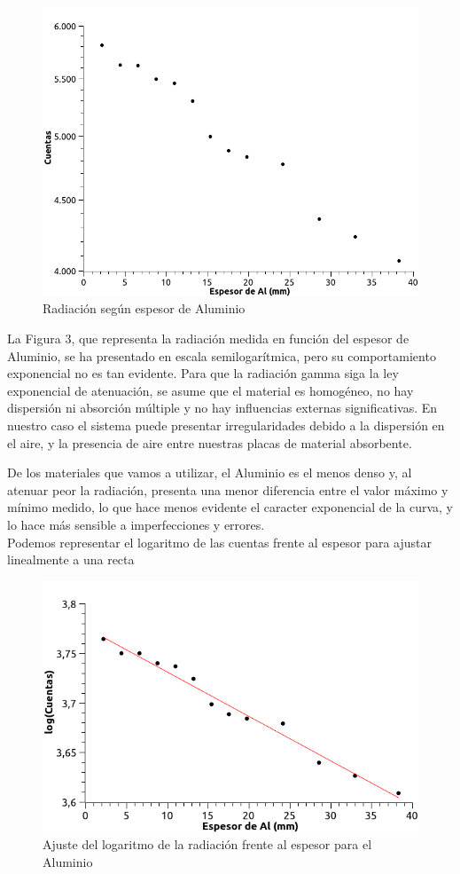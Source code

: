 \documentclass[a4paper,12pt,spanish]{article}
\begin{document}
	\begin{figure}[H]
		\centering
		\includegraphics[width=0.9\linewidth]{images/graficas_practica_4/aluminio_cuentas}
		\caption{Radiación según espesor de Aluminio}
		\label{fig:aluminiocuentas}
	\end{figure}
	
	
	La Figura 3, que representa la radiación medida en función del espesor de Aluminio, se ha presentado en escala semilogarítmica, pero su comportamiento exponencial no es tan evidente. Para que la radiación gamma siga la ley exponencial de atenuación, se asume que el material es homogéneo, no hay dispersión ni absorción múltiple y no hay influencias externas significativas. En nuestro caso el sistema puede presentar irregularidades debido a la dispersión en el aire, y la presencia de aire entre nuestras placas de material absorbente. 
	
	
	De los materiales que vamos a utilizar, el Aluminio es el menos denso y, al atenuar peor la radiación, presenta una menor diferencia entre el valor máximo y mínimo medido, lo que hace menos evidente el caracter exponencial de la curva, y lo hace más sensible a imperfecciones y errores.\\
		
	
	Podemos representar el logaritmo de las cuentas frente al espesor para ajustar linealmente a una recta
	
	
		
	\begin{figure}[H]
		\centering
		\includegraphics[width=0.7\linewidth]{images/graficas_practica_4/aluminio_ajuste}
		\caption{Ajuste del logaritmo de la radiación frente al espesor para el Aluminio}
		\label{fig:aluminioajuste}
	\end{figure}
\end{document}
